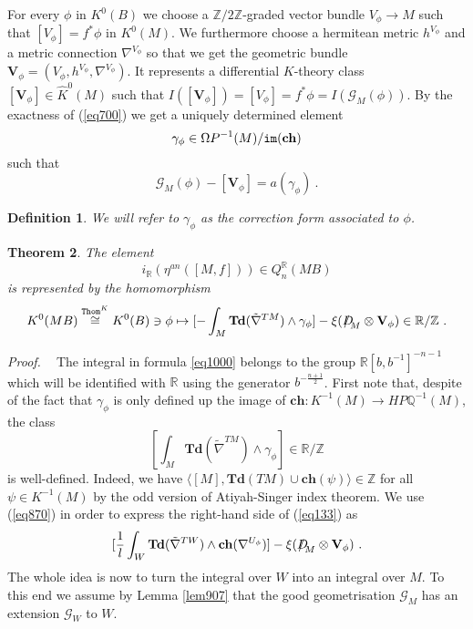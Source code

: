 \documentclass[12pt]{article}
\newtheorem{theorem}{Theorem}[section]
\newtheorem{ddd}[theorem]{Definition}
\newcommand{\Thom}{{\tt Thom}}
\newcommand{\im}{{\tt im}}
\newcommand{\cG}{{\mathcal{G}}}
\newcommand{\proof}{{\it Proof.$\:\:\:\:$}}
\newcommand{\Z}{{\mathbb{Z}}}
\newcommand{\Q}{{\mathbb{Q}}}
\newcommand{\R}{{\mathbb{R}}}
\newcommand{\Td}{{\mathbf{Td}}}
\newcommand{\ch}{{\mathbf{ch}}}
\newcommand{\bV}{{\mathbf{V}}}
\newcommand{\Dirac}{{D\hspace{-0.27cm}/}}
\begin{document}
For every $\phi$ in $K^{0}(B)$ we choose a $\Z/2\Z$-graded vector bundle $V_{\phi}\to M$  such that   $[V_{\phi}]=f^{*}\phi$ in $K^{0}(M)$. We furthermore choose a
hermitean metric $h^{V_{\phi}}$ and a metric connection $\nabla^{V_{\phi}}$ so that we get the geometric bundle
$\bV_{\phi}=(V_{\phi},h^{V_{\phi}},\nabla^{V_{\phi}})$. It represents a differential $K$-theory class $[\bV_{\phi}]\in \hat K^{0}(M)$ such that $I([\bV_{\phi}])=[V_{\phi}]=f^{*}\phi=I(\cG_{M}(\phi))$.
By the exactness of (\ref{eq700}) 
 we get a uniquely determined element  $$\gamma_{\phi}\in \Omega P^{-1}(M)/\im(\ch)$$  such that
\begin{equation}\label{eq1450}\cG_{M}(\phi)-[\bV_{\phi}]=a(\gamma_{\phi})\ .\end{equation}
\begin{ddd}\label{cgkl1}
We will refer to $\gamma_{\phi}$ as the correction form associated to $\phi$.
\end{ddd}
\begin{theorem}\label{them2}
The element $$i_{\R}(\eta^{an}([M,f]))\in Q^{\R}_{n}(MB)$$ is represented by the homomorphism
\begin{equation}\label{eq1000} K^{0}(MB)\stackrel{\Thom^{K}}{\cong }K^{0}(B)\ni \phi \mapsto [-\int_{M} \Td(\tilde \nabla^{TM})\wedge \gamma_{\phi}] -\xi(\Dirac_{M}\otimes \bV_{\phi}) \in \R/\Z\ .\end{equation}
\end{theorem}
\proof
The integral in formula \eqref{eq1000} belongs to  the group $\R[b,b^{-1}]^{-n-1}$ which will be identified with $\R$ using the generator
$b^{-\frac{n+1}{2}}$.
First note that, despite of the fact that $\gamma_{\phi}$ is only defined up the image of $\ch:K^{-1}(M)\to HP\Q^{-1}(M)$,  the class
$$[\int_{M} \Td(\tilde \nabla^{TM})\wedge \gamma_{\phi}]\in \R/\Z$$ is well-defined. Indeed, we have  
$\langle [M],\Td(TM)\cup \ch(\psi)\rangle\in \Z$ for all $\psi\in K^{-1}(M)$ by the odd version of  Atiyah-Singer index theorem.
We use  (\ref{eq870}) in order to express the right-hand side of
(\ref{eq133}) as
$$[\frac{1}{l}\int_{W}\Td(\tilde \nabla^{TW})\wedge \ch(\nabla^{U_{\phi}})]-\xi(\Dirac_{M}\otimes\bV_{\phi})\ .$$
The whole idea  is now to turn the integral over $W$ into an integral over $M$.
To this end we assume by Lemma \ref{lem907} that the good geometrisation $\cG_{M}$ has an extension $\cG_{W}$ to $W$. 
\end{document}
